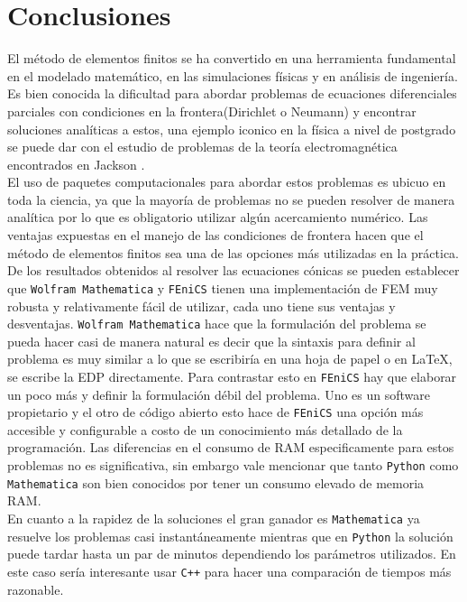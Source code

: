 \documentclass[a4paper]{article}
\begin{document}
\section{Conclusiones}

El método de elementos finitos se ha convertido en una herramienta fundamental en el modelado matemático, en las simulaciones físicas y en análisis de ingeniería. Es bien conocida la dificultad para abordar problemas de ecuaciones diferenciales parciales con condiciones en la frontera(Dirichlet o Neumann) y encontrar soluciones analíticas a estos, una ejemplo iconico en la física a nivel de postgrado se puede dar con el estudio de problemas de la teoría electromagnética encontrados en Jackson \cite{Jackson}.\\

El uso de paquetes computacionales para abordar estos problemas es ubicuo en toda la ciencia, ya que la mayoría de problemas no se pueden resolver de manera analítica por lo que es obligatorio utilizar algún acercamiento numérico. Las ventajas expuestas en el manejo de las condiciones de frontera hacen que el método de elementos finitos sea una de las opciones más utilizadas en la práctica.\\

De los resultados obtenidos al resolver las ecuaciones cónicas se pueden establecer que \texttt{Wolfram Mathematica} y \texttt{FEniCS} tienen una implementación de FEM muy robusta y relativamente fácil de utilizar, cada uno tiene sus ventajas y desventajas. \texttt{Wolfram Mathematica} hace que la formulación del problema se pueda hacer casi de manera natural es decir que la sintaxis para definir al problema es muy similar a lo que se escribiría en una hoja de papel o en LaTeX, se escribe la EDP directamente. Para contrastar esto en \texttt{FEniCS} hay que elaborar un poco más y definir la formulación débil del problema. Uno es un software propietario y el otro de código abierto esto hace de \texttt{FEniCS} una opción más accesible y configurable a costo de un conocimiento más detallado de la programación. Las diferencias en el consumo de RAM especificamente para estos problemas no es significativa, sin embargo vale mencionar que tanto \texttt{Python} como \texttt{Mathematica} son bien conocidos por tener un consumo elevado de memoria RAM.\\
En cuanto a la rapidez de la soluciones el gran ganador es \texttt{Mathematica} ya resuelve los problemas casi instantáneamente mientras que en \texttt{Python} la solución puede tardar hasta un par de minutos dependiendo los parámetros utilizados. En este caso sería interesante usar \texttt{C++} para hacer una comparación de tiempos más razonable.
\end{document}
